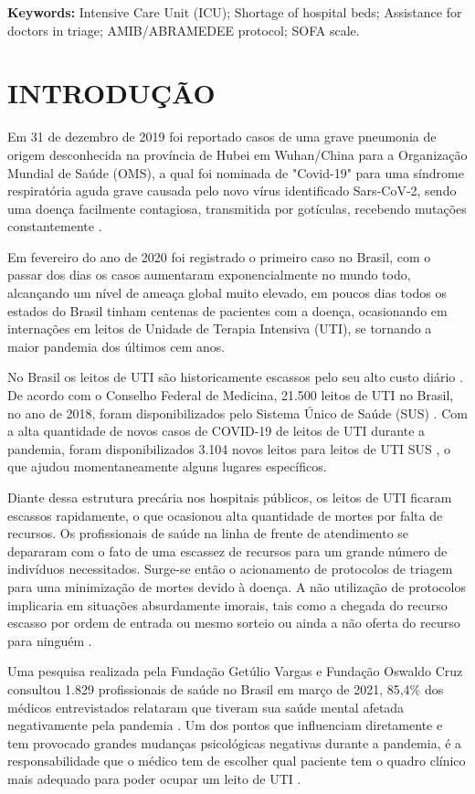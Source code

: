 \documentclass[12pt]{article}
\begin{document}
\textbf{Keywords:} Intensive Care Unit (ICU); Shortage of hospital beds; Assistance for doctors in triage; AMIB/ABRAMEDEE protocol; SOFA scale.

\section{INTRODUÇÃO}

Em 31 de dezembro de 2019 foi reportado casos de uma grave pneumonia de origem desconhecida na província de Hubei em Wuhan/China para a Organização Mundial de Saúde (OMS), a qual foi nominada de "Covid-19" para uma síndrome respiratória aguda grave causada pelo novo vírus identificado Sars-CoV-2, sendo uma doença facilmente contagiosa, transmitida por gotículas, recebendo mutações constantemente \cite{sa2020especial}. 

Em fevereiro do ano de 2020 foi registrado o primeiro caso no Brasil, com o passar dos dias os casos aumentaram exponencialmente no mundo todo, alcançando um nível de ameaça global muito elevado, em poucos dias todos os estados do Brasil tinham centenas de pacientes com a doença, ocasionando em internações em leitos de Unidade de Terapia Intensiva (UTI), se tornando a maior pandemia dos últimos cem anos.

No Brasil os leitos de UTI são historicamente escassos pelo seu alto custo diário \cite{murthy2015intensive}. De acordo com o Conselho Federal de Medicina, 21.500 leitos de UTI no Brasil, no ano de 2018, foram disponibilizados pelo Sistema Único de Saúde (SUS) \cite{cfm2018,cfm2020}. Com a alta quantidade de novos casos de COVID-19 de leitos de UTI durante a pandemia, foram disponibilizados 3.104 novos leitos para leitos de UTI SUS \cite{cotrim2020crescimento}, o que ajudou momentaneamente alguns lugares específicos.

Diante dessa estrutura precária nos hospitais públicos, os leitos de UTI  ficaram escassos rapidamente, o que ocasionou alta quantidade de mortes por falta de recursos. Os profissionais de saúde na linha de frente de atendimento se depararam com o fato de uma escassez de recursos para um grande número de indivíduos necessitados. Surge-se então o acionamento de protocolos de triagem para uma minimização de mortes devido à doença. A não utilização de protocolos implicaria em situações absurdamente imorais, tais como a chegada do recurso escasso por ordem de entrada ou mesmo sorteio ou ainda a não oferta do recurso para ninguém \cite{costa2020protocolos}.

Uma pesquisa realizada pela Fundação Getúlio Vargas e Fundação Oswaldo Cruz consultou 1.829 profissionais de saúde no Brasil em março de 2021, 85,4\% dos médicos entrevistados relataram que tiveram sua saúde mental afetada negativamente pela pandemia \cite{paulomotoryn2021}. Um dos pontos que influenciam diretamente e tem provocado grandes mudanças psicológicas negativas durante a pandemia, é a responsabilidade que o médico tem de escolher qual paciente tem o quadro clínico mais adequado para poder ocupar um leito de UTI \cite{teixeira2020processo}.
\end{document}
